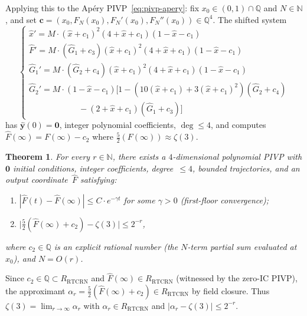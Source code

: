 \documentclass[11pt]{article}
\newtheorem{theorem}{Theorem}
\newcommand{\Q}{\mathbb{Q}}
\newcommand{\N}{\mathbb{N}}
\newcommand{\RTCRN}{R_{\mathrm{RTCRN}}}
\begin{document}
Applying this to the Ap\'ery PIVP~\eqref{eq:pivp-apery}:
fix $x_0 \in (0,1) \cap \Q$ and $N \in \N$, and set
$\mathbf{c} = (x_0, F_N(x_0), F_N'(x_0), F_N''(x_0)) \in \Q^4$.
The shifted system
\begin{equation}\label{eq:shifted}
\begin{cases}
  \hat{x}' = M\cdot (\hat{x}+c_1)^2(4+\hat{x}+c_1)(1-\hat{x}-c_1) \\[3pt]
  \hat{F}' = M\cdot (\hat{G}_1+c_3)(\hat{x}+c_1)^2(4+\hat{x}+c_1)(1-\hat{x}-c_1) \\[3pt]
  \hat{G}_1' = M\cdot (\hat{G}_2+c_4)(\hat{x}+c_1)^2(4+\hat{x}+c_1)(1-\hat{x}-c_1) \\[3pt]
  \hat{G}_2' = M\cdot (1-\hat{x}-c_1)\bigl[1 - (10(\hat{x}+c_1)+3(\hat{x}+c_1)^2)(\hat{G}_2+c_4) \\
    \qquad\qquad\qquad - (2+\hat{x}+c_1)(\hat{G}_1+c_3)\bigr]
\end{cases}
\end{equation}
has $\hat{\mathbf{y}}(0) = \mathbf{0}$, integer polynomial coefficients,
$\deg \le 4$, and computes $\hat{F}(\infty) = F(\infty) - c_2$
where $\tfrac{5}{2}(F(\infty)) \approx \zeta(3)$.

\begin{theorem}\label{thm:family}
For every $r \in \N$, there exists a $4$-dimensional polynomial PIVP
with $\mathbf{0}$ initial conditions, integer coefficients, degree~$\le 4$,
bounded trajectories, and an output coordinate~$\hat{F}$ satisfying:
\begin{enumerate}
\item $|\hat{F}(t) - \hat{F}(\infty)| \le C \cdot e^{-\gamma t}$
  for some $\gamma > 0$ (first-floor convergence);
\item $\bigl|\tfrac{5}{2}(\hat{F}(\infty) + c_2) - \zeta(3)\bigr| \le 2^{-r}$,
\end{enumerate}
where $c_2 \in \Q$ is an explicit rational number
(the $N$-term partial sum evaluated at~$x_0$),
and $N = O(r)$.
\end{theorem}

Since $c_2 \in \Q \subset \RTCRN$ and $\hat{F}(\infty) \in \RTCRN$
(witnessed by the zero-IC PIVP), the approximant
$\alpha_r = \tfrac{5}{2}(\hat{F}(\infty) + c_2) \in \RTCRN$
by field closure.
Thus $\zeta(3) = \lim_{r \to \infty} \alpha_r$ with $\alpha_r \in \RTCRN$
and $|\alpha_r - \zeta(3)| \le 2^{-r}$.
\end{document}
